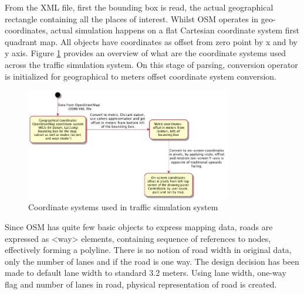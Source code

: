 From the XML file, first the bounding box is read, the actual geographical rectangle containing all the places of interest. Whilst OSM operates in geo-coordinates, actual simulation happens on a flat Cartesian coordinate system first quadrant map. All objects have coordinates as offset from zero point by x and by y axis. Figure \ref{fig:coordinateConversions} provides an overview of what are the coordinate systems used across the traffic simulation system. On this stage of parsing, conversion operator is initialized for geographical to meters offset coordinate system conversion.

\begin{figure}[h]
    \caption{Coordinate systems used in traffic simulation system}
    \label{fig:coordinateConversions}
    \centering
    \includegraphics[width=0.8\textwidth]{../../uml_diagrams/coordinateSystems.png}
\end{figure}

 Since OSM has quite few basic objects to express mapping data, roads are expressed as <way> elements, containing sequence of references to nodes, effectively forming a polyline. There is no notion of road width in original data, only the number of lanes and if the road is one way. The design decision has been made to default lane width to standard 3.2 meters. Using lane width, one-way flag and number of lanes in road, physical representation of road is created.

